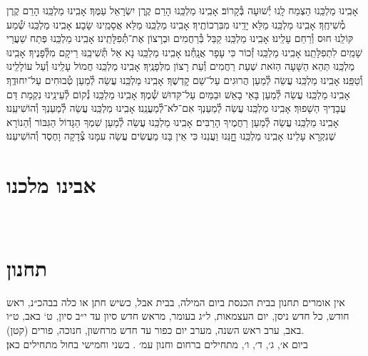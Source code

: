 \documentclass[twoside, openany, parskip=half, 11pt]{book}
\begin{document}
{אָבִֽינוּ מַלְכֵּֽנוּ הַצְמַח לָֽנוּ יְ֯שׁוּעָה בְּ֯קָרוֹב׃\hfill \break
אָבִֽינוּ מַלְכֵּֽנוּ הָרֵם קֶֽרֶן יִשְׂרָאֵל עַמֶּךָ׃\hfill \break
אָבִֽינוּ מַלְכֵּֽנוּ הָרֵם קֶרֶן מְ֯שִׁיחֶֽךָ׃\hfill \break
אָבִֽינוּ מַלְכֵּֽנוּ מַלֵּא יָדֵֽינוּ מִבִּרְכוֹתֶֽיךָ׃\hfill \break
אָבִֽינוּ מַלְכֵּֽנוּ מַלֵּא אֲסָמֵֽינוּ שָׂבָע׃\hfill \break
אָבִֽינוּ מַלְכֵּֽנוּ שְׁ֯מַע קּוֹלֵֽנוּ חוּס וְ֯רַחֵם עָלֵֽינוּ׃\hfill \break
אָבִֽינוּ מַלְכֵּֽנוּ קַבֵּל בְּ֯רַחֲמִים וּבְרָצוֹן אֶת־תְּ֯פִלָּתֵֽינוּ׃\hfill \break
אָבִֽינוּ מַלְכֵּֽנוּ פְּתַח שַׁעֲרֵי שָׁמַֽיִם לִתְפִלָּתֵֽנוּ׃\hfill \break
אָבִֽינוּ מַלְכֵּֽנוּ זְ֯כוֹר כִּי עָפָר אֲנָֽחְ֯נוּ׃\hfill \break
אָבִֽינוּ מַלְכֵּֽנוּ נָא אַל תְּ֯שִׁיבֵֽנּוּ רֵיקָם מִלְּ֯פָנֶיךָ׃\hfill \break
אָבִֽינוּ מַלְכֵּֽנוּ תְּהֵא הַשָּׁעָה הַזֹּאת שְׁעַת רַחֲמִים וְ֯עֵת רָצוֹן מִלְּפָנֶֽיךָ׃\hfill \break
אָבִֽינוּ מַלְכֵּֽנוּ חֲמוֹל עָלֵֽינוּ וְ֯עַל עוֹלָלֵֽינוּ וְ֯טַפֵּֽנוּ׃\hfill \break
אָבִֽינוּ מַלְכֵּֽנוּ עֲשֵׂה לְ֯מַעַן הֲרוּגִים עַל־שֵׁם קׇדְשֶׁךָ׃\hfill \break
אָבִֽינוּ מַלְכֵּֽנוּ עֲשֵׂה לְ֯מַעַן טְ֯בוּחִים עַל־יִחוּדֶֽךָ׃\hfill \break
אָבִֽינוּ מַלְכֵּֽנוּ עֲשֵׂה לְ֯מַעַן בָּאֵי בָאֵשׁ וּבַמַּיִם עַל־קִּדוּשׁ שְׁ֯מֶךָ׃\hfill \break
אָבִֽינוּ מַלְכֵּֽנוּ נְ֯קוֹם לְ֯עֵינֵֽינוּ נִקְמַת דַּם עֲבָדֶיךָ הַשָׁפוּךְ׃\hfill \break
אָבִֽינוּ מַלְכֵּֽנוּ עֲשֵׂה לְ֯מַעַנְךָ אִם־לֹא־לְ֯מַעֲנֵֽנוּ׃\hfill \break
אָבִֽינוּ מַלְכֵּֽנוּ עֲשֵׂה לְ֯מַעַנְךָ וְ֯הוֹשִׁיעֵֽנוּ׃\hfill \break
אָבִֽינוּ מַלְכֵּֽנוּ עֲשֵׂה לְ֯מַעַן רַחֲמֶיךָ הָרַבִּים׃\hfill \break
אָבִֽינוּ מַלְכֵּֽנוּ עֲשֵׂה לְ֯מַעַן שִׁמְךָ הַגָּדוֹל הַגִּבּוֹר וְ֯הַנוֹרָא שֶׁנִקְרָא עָלֵינוּ׃\hfill \break
אָבִֽינוּ מַלְכֵּֽנוּ חׇׇׇנֵּנוּ וַעֲנֵנוּ כִּי אֵין בָּנוּ מַעֲשִׂים עֲשֵׂה עִמָּנוּ צְ֯דָקָה וָחֶסֶד וְ֯הוֹשִׁיעֵנוּ׃

}

\section[אבינו מלכנו]{ אבינו מלכנו }
\label{avinu malkeinu}


\avinumalkeinu

\vfill
{}\\
\section[תחנון]{ תחנון }
\label{tachanun mon thurs}
\begin{scriptsize}

\textsf{
אין אומרים תחנון בבית הכנסת ביום המילה, בבית אבל, כשיש חתן או כלה בבהכ״נ, ראש חודש, כל חדש ניסן, יום העצמאות, ל״ג בעומר, מראש חדש סיון עד י״ב סיון, ט` באב, ט״ו באב, ערב ראש השנה, מערב יום כפור עד חדש מרחשון, חנוכה, פורים (קטן).\\
ביום א׳, ג׳, ד׳, ו׳, מתחילים ברחום וחנון עמ׳
\pageref{nefilas_apayim}.
בשני וחמישי בחול מתחילים כאן׃
}

\end{scriptsize}
\end{document}
